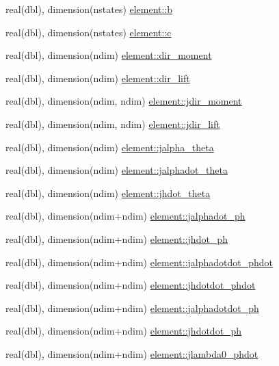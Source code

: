 \begin{DoxyCompactItemize}
\item 
real(dbl), dimension(nstates) \hyperlink{namespaceelement_a031bf1cdfa87524ec1b508c44f537002}{element\+::b}
\item 
real(dbl), dimension(nstates) \hyperlink{namespaceelement_a1203577a202409830d687bf3b68c621e}{element\+::c}
\item 
real(dbl), dimension(ndim) \hyperlink{namespaceelement_a88c83da354d518bfd81c3ef7691b4682}{element\+::dir\+\_\+moment}
\item 
real(dbl), dimension(ndim) \hyperlink{namespaceelement_a10ce0718ec68d00dd9fab0c290410366}{element\+::dir\+\_\+lift}
\item 
real(dbl), dimension(ndim, ndim) \hyperlink{namespaceelement_a1dcc074ceaab61da55e1b1964ea3d235}{element\+::jdir\+\_\+moment}
\item 
real(dbl), dimension(ndim, ndim) \hyperlink{namespaceelement_a580ce3f83ad83383203449b2d8f4a3a4}{element\+::jdir\+\_\+lift}
\item 
real(dbl), dimension(ndim) \hyperlink{namespaceelement_a38bfdfabd1e6c253836e6fb02c0d6784}{element\+::jalpha\+\_\+theta}
\item 
real(dbl), dimension(ndim) \hyperlink{namespaceelement_a6c09852dc997af8b311d0ced2855794d}{element\+::jalphadot\+\_\+theta}
\item 
real(dbl), dimension(ndim) \hyperlink{namespaceelement_a8fc86f2f6fcef7f4b4216181ed52a8b7}{element\+::jhdot\+\_\+theta}
\item 
real(dbl), dimension(ndim+ndim) \hyperlink{namespaceelement_a21fa4f1bba2c9d7c57ba982869fe0a95}{element\+::jalphadot\+\_\+ph}
\item 
real(dbl), dimension(ndim+ndim) \hyperlink{namespaceelement_a9ef70f6658a771b1ae6491475da5f9c3}{element\+::jhdot\+\_\+ph}
\item 
real(dbl), dimension(ndim+ndim) \hyperlink{namespaceelement_ab9d2421c52f64e5ff0b10858aca6bd43}{element\+::jalphadotdot\+\_\+phdot}
\item 
real(dbl), dimension(ndim+ndim) \hyperlink{namespaceelement_a0928be80ffe200a8be069851f2c20dbd}{element\+::jhdotdot\+\_\+phdot}
\item 
real(dbl), dimension(ndim+ndim) \hyperlink{namespaceelement_a098f0887e0821d48cc06e45f446b9aab}{element\+::jalphadotdot\+\_\+ph}
\item 
real(dbl), dimension(ndim+ndim) \hyperlink{namespaceelement_a2ce32735f66193668003049e1cf17d61}{element\+::jhdotdot\+\_\+ph}
\item 
real(dbl), dimension(ndim+ndim) \hyperlink{namespaceelement_a7c62d3aab34ad67ea920d7293726205e}{element\+::jlambda0\+\_\+phdot}

\end{DoxyCompactItemize}
